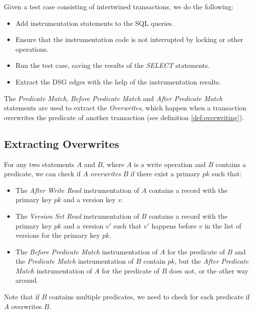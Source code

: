 Given a test case consisting of intertwined transactions, we do the following:

\begin{itemize}
    \item Add instrumentation statements to the SQL queries.
    \item Ensure that the instrumentation code is not interrupted by locking or other operations.
    \item Run the test case, saving the results of the \textit{SELECT} statements.
    \item Extract the DSG edges with the help of the instrumentation results. 
\end{itemize}

The \textit{Predicate Match}, \textit{Before Predicate Match} and \textit{After Predicate Match} statements are used to extract the \textit{Overwrites}, which happen when a transaction overwrites the predicate of another transaction (see definition \ref{def:overwriting}).

\subsection{Extracting Overwrites}

For any two statements $A$ and $B$, where $A$ is a write operation and $B$ contains a predicate, we can check if $A$ \textit{overwrites} $B$ if there exist a primary $pk$ such that:
\begin{itemize}
    \item The \textit{After Write Read} instrumentation of $A$ contains a record with the primary key $pk$ and a version key $v$.
    \item The \textit{Version Set Read} instrumentation of $B$ contains a record with the primary key $pk$ and a version $v'$ such that $v'$ happens before $v$ in the list of versions for the primary key $pk$.
    \item The \textit{Before Predicate Match} instrumentation of $A$ for the predicate of $B$ and the \textit{Predicate Match} instrumentation of $B$ contain $pk$, but the \textit{After Predicate Match} instrumentation of $A$ for the predicate of $B$ does not, or the other way around.
\end{itemize}

Note that if $B$ contains multiple predicates, we need to check for each predicate if $A$ overwrites $B$.

